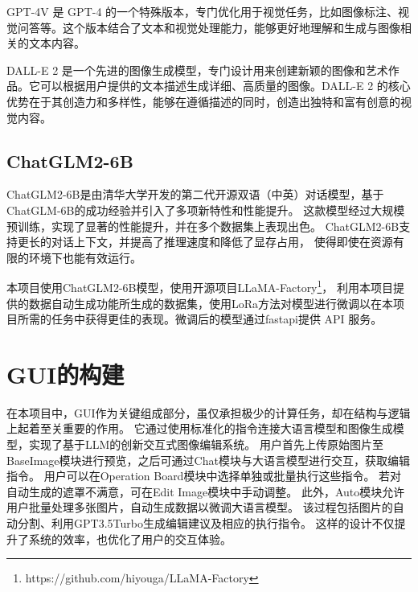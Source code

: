\documentclass[a4paper,AutoFakeBold,oneside,12pt]{book}
\begin{document}
GPT-4V 是 GPT-4 的一个特殊版本，专门优化用于视觉任务，比如图像标注、视觉问答等。这个版本结合了文本和视觉处理能力，能够更好地理解和生成与图像相关的文本内容。

DALL-E 2 是一个先进的图像生成模型，专门设计用来创建新颖的图像和艺术作品。它可以根据用户提供的文本描述生成详细、高质量的图像。DALL-E 2 的核心优势在于其创造力和多样性，能够在遵循描述的同时，创造出独特和富有创意的视觉内容。

\section{ChatGLM2-6B}
ChatGLM2-6B是由清华大学开发的第二代开源双语（中英）对话模型，基于ChatGLM-6B的成功经验并引入了多项新特性和性能提升。
这款模型经过大规模预训练，实现了显著的性能提升，并在多个数据集上表现出色。
ChatGLM2-6B支持更长的对话上下文，并提高了推理速度和降低了显存占用，
使得即使在资源有限的环境下也能有效运行。

本项目使用ChatGLM2-6B模型，使用开源项目LLaMA-Factory\footnote{https://github.com/hiyouga/LLaMA-Factory}，
利用本项目提供的数据自动生成功能所生成的数据集，使用LoRa\cite{hu2021lora}方法对模型进行微调以在本项目所需的任务中获得更佳的表现。微调后的模型通过fastapi提供 API 服务。

\chapter{GUI的构建} %
在本项目中，GUI作为关键组成部分，虽仅承担极少的计算任务，却在结构与逻辑上起着至关重要的作用。
它通过使用标准化的指令连接大语言模型和图像生成模型，实现了基于LLM的创新交互式图像编辑系统。
用户首先上传原始图片至BaseImage模块进行预览，之后可通过Chat模块与大语言模型进行交互，获取编辑指令。
用户可以在Operation Board模块中选择单独或批量执行这些指令。
若对自动生成的遮罩不满意，可在Edit Image模块中手动调整。
此外，Auto模块允许用户批量处理多张图片，自动生成数据以微调大语言模型。
该过程包括图片的自动分割、利用GPT3.5Turbo生成编辑建议及相应的执行指令。
这样的设计不仅提升了系统的效率，也优化了用户的交互体验。
\end{document}
